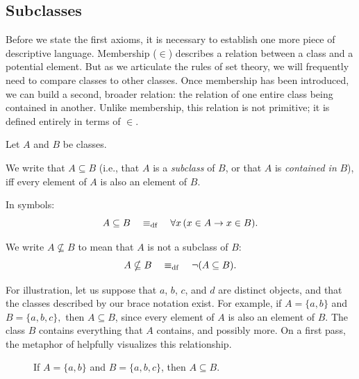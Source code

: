 \subsection{Subclasses}

 Before we state the first axioms, it is necessary to establish one more piece of descriptive language. Membership (\(\in\)) describes a relation between a class and a potential element. But as we articulate the rules of set theory, we will frequently need to compare classes to other classes. Once membership has been introduced, we can build a second, broader relation: the relation of one entire class being contained in another. Unlike membership, this relation is not primitive; it is defined entirely in terms of \(\in\).

\begin{definition}[Subclass]\label{def:subclass}
Let \(A\) and \(B\) be classes.

We write that \(A \subseteq B\) (i.e., that \(A\) is a \textit{subclass} of \(B\), or that \(A\) is \textit{contained in} \(B\)), iff every element of \(A\) is also an element of \(B\).

In symbols:
\[
A \subseteq B \quad \mathrel{\equiv_{\mathrm{df}}} \quad
\forall x\,(x \in A \to x \in B).
\]

We write \(A \nsubseteq B\) to mean that \(A\) is not a subclass of \(B\):
\[
A \nsubseteq B \quad \mathrel{\equiv_{\mathrm{df}}} \quad
\neg(A\subseteq B).
\]
\end{definition}

 For illustration, let us suppose that \(a\), \(b\), \(c\), and \(d\) are distinct objects, and that the classes described by our brace notation exist. For example, if \(A = \{a,b\}\) and \(B = \{a,b,c\},\) then \(A \subseteq B\), since every element of \(A\) is also an element of \(B\). The class \(B\) contains everything that \(A\) contains, and possibly more. On a first pass, the metaphor of  helpfully visualizes this relationship.

\begin{sideillustration}[subclass]
\begin{figure}[h]
\centering
{}
\caption{If \(A=\{a,b\}\) and \(B=\{a,b,c\}\), then \(A \subseteq B\).}\label{fig:subclass}
\end{figure}
\end{sideillustration}

